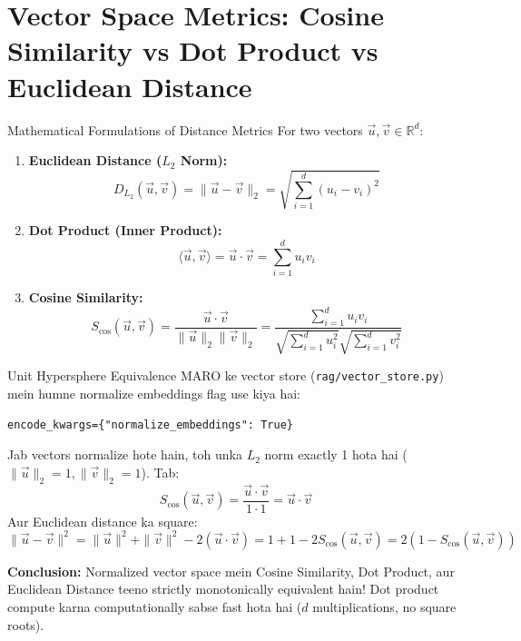 \documentclass[11pt,a4paper,twoside]{report}
\begin{document}
\section{Vector Space Metrics: Cosine Similarity vs Dot Product vs Euclidean Distance}

\begin{conceptbox}{Mathematical Formulations of Distance Metrics}
For two vectors $\vec{u}, \vec{v} \in \mathbb{R}^d$:

\begin{enumerate}
    \item \textbf{Euclidean Distance ($L_2$ Norm):}
    \begin{equation}
    D_{L_2}(\vec{u}, \vec{v}) = \|\vec{u} - \vec{v}\|_2 = \sqrt{\sum_{i=1}^d (u_i - v_i)^2}
    \end{equation}

    \item \textbf{Dot Product (Inner Product):}
    \begin{equation}
    \langle \vec{u}, \vec{v} \rangle = \vec{u} \cdot \vec{v} = \sum_{i=1}^d u_i v_i
    \end{equation}

    \item \textbf{Cosine Similarity:}
    \begin{equation}
    S_{\cos}(\vec{u}, \vec{v}) = \frac{\vec{u} \cdot \vec{v}}{\|\vec{u}\|_2 \|\vec{v}\|_2} = \frac{\sum_{i=1}^d u_i v_i}{\sqrt{\sum_{i=1}^d u_i^2} \sqrt{\sum_{i=1}^d v_i^2}}
    \end{equation}
\end{enumerate}
\end{conceptbox}

\begin{analogy}{Unit Hypersphere Equivalence}
MARO ke vector store (\texttt{rag/vector\_store.py}) mein humne normalize embeddings flag use kiya hai:
\begin{lstlisting}[style=pythonstyle]
encode_kwargs={"normalize_embeddings": True}
\end{lstlisting}
Jab vectors normalize hote hain, toh unka $L_2$ norm exactly 1 hota hai ($\|\vec{u}\|_2 = 1, \|\vec{v}\|_2 = 1$).
Tab:
$$S_{\cos}(\vec{u}, \vec{v}) = \frac{\vec{u} \cdot \vec{v}}{1 \cdot 1} = \vec{u} \cdot \vec{v}$$
Aur Euclidean distance ka square:
$$\|\vec{u} - \vec{v}\|^2 = \|\vec{u}\|^2 + \|\vec{v}\|^2 - 2(\vec{u} \cdot \vec{v}) = 1 + 1 - 2 S_{\cos}(\vec{u}, \vec{v}) = 2(1 - S_{\cos}(\vec{u}, \vec{v}))$$

\textbf{Conclusion:} Normalized vector space mein Cosine Similarity, Dot Product, aur Euclidean Distance teeno strictly monotonically equivalent hain! Dot product compute karna computationally sabse fast hota hai ($d$ multiplications, no square roots).
\end{analogy}
\end{document}
